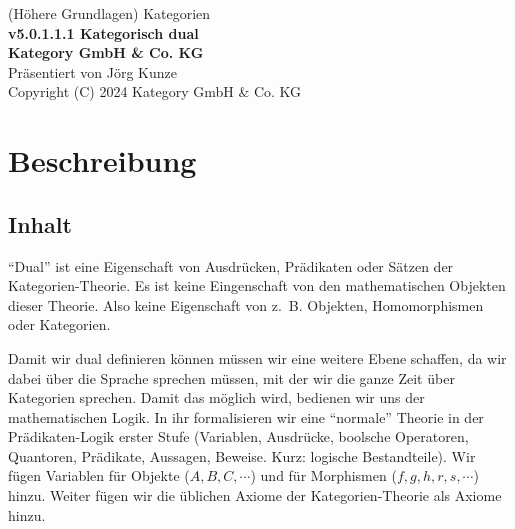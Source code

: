 \documentclass[a4paper]{amsart}
\theoremstyle{definition}
\newcommand{\zb}{z.~B. }
\begin{document}
\begin{titlepage}
\centering
{\huge
(Höhere Grundlagen) Kategorien\\[1cm]
\textbf{v5.0.1.1.1 Kategorisch dual}
}\\[1cm]

\textbf{Kategory GmbH \& Co. KG}\\
Präsentiert von Jörg Kunze\\
Copyright (C) 2024 Kategory GmbH \& Co. KG

\end{titlepage}

%

\newpage

\section*{Beschreibung}

\subsection*{Inhalt}
"`Dual"' ist eine Eigenschaft von Ausdrücken, Prädikaten oder Sätzen der Kategorien-Theorie. Es ist keine Eingenschaft von den mathematischen Objekten dieser Theorie. Also keine Eigenschaft von \zb Objekten, Homomorphismen oder Kategorien.

Damit wir dual definieren können müssen wir eine weitere Ebene schaffen, da wir dabei über die Sprache sprechen müssen, mit der wir die ganze Zeit über Kategorien sprechen. Damit das möglich wird, bedienen wir uns der mathematischen Logik. In ihr formalisieren wir eine "`normale"' Theorie in der Prädikaten-Logik erster Stufe (Variablen, Ausdrücke, boolsche Operatoren, Quantoren, Prädikate, Aussagen, Beweise. Kurz: logische Bestandteile). Wir fügen Variablen für Objekte ($A,B,C, \cdots$) und für Morphismen ($f, g, h, r, s, \cdots$) hinzu. Weiter fügen wir die üblichen Axiome der Kategorien-Theorie als Axiome hinzu. 
\end{document}
